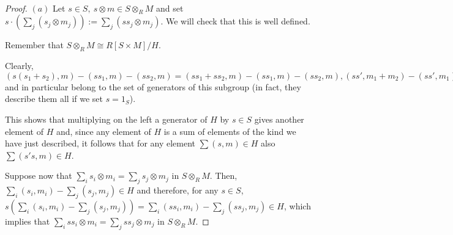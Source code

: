 \documentclass{article}
\newcommand{\exercise}[1]{\noindent {\bf Exercise #1}}
\begin{document}
~\\
\exercise{6.5}

\begin{proof}
	$(a)$ Let $s\in S,\ s\otimes m\in S\otimes_R M$ and set $s\cdot (\sum_j (s_j\otimes m_j)):=\sum_j (ss_j\otimes m_j)$. We will check that this is well defined.
	
	Remember that $S\otimes_R M\cong R[S\times M]/H$.
	
	Clearly, $(s(s_1+s_2),m)-(ss_1,m)-(ss_2,m)=(ss_1+ss_2,m)-(ss_1,m)-(ss_2,m),(ss',m_1+m_2)-(ss',m_1)-(ss',m_2),(s(s'r),m)-(ss',rm)=((ss')r,m)-(ss',rm)\in H$ and in particular belong to the set of generators of this subgroup (in fact, they describe them all if we set $s=1_S$).
	
	This shows that multiplying on the left a generator of $H$ by $s\in S$ gives another element of $H$ and, since any element of $H$ is a sum of elements of the kind we have just described, it follows that for any element $\sum (s,m)\in H$ also $\sum (s's,m)\in H$.
	
	Suppose now that $\sum_i s_i\otimes m_i=\sum_j s_j\otimes m_j$ in $S\otimes_R M$. Then, $\sum_i (s_i,m_i)-\sum_j (s_j,m_j)\in H$ and therefore, for any $s\in S$, $s(\sum_i (s_i,m_i)-\sum_j (s_j,m_j))=\sum_i (ss_i,m_i)-\sum_j (ss_j,m_j)\in H$, which implies that $\sum_i ss_i\otimes m_i=\sum_j ss_j\otimes m_j$ in $S\otimes_R M$.
	

\end{proof}
\end{document}
